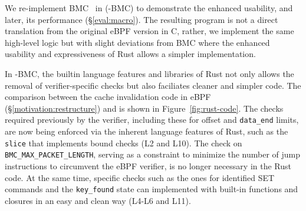 


We re-implement BMC~\cite{BMC} in \projname{} (\projname{}-BMC) to demonstrate
    the enhanced usability, and later, its performance (\S\ref{eval:macro}).
The resulting program is not a direct translation from the original eBPF
    version in C, rather, we implement the same high-level logic but with
    slight deviations from BMC where the enhanced usability and expressiveness
    of Rust allows a simpler implementation.

In \projname{}-BMC, the builtin language features and libraries of Rust not
    only allows the removal of verifier-specific checks but also faciliates
    cleaner and simpler code.
The comparison between the cache invalidation code in eBPF
    (\S\ref{motivation:restructure}) and \projname{} is shown in
    Figure~\ref{fig:rust-code}.
The checks required previously by the verifier, including these for offset and
    \texttt{data\_end} limits, are now being enforced via the inherent language
    features of Rust, such as the \texttt{slice} that implements bound checks
    (L2 and L10).
The check on \texttt{BMC\_MAX\_PACKET\_LENGTH}, serving as a constraint to
    minimize the number of jump instructions to circumvent the eBPF verifier,
    is no longer necessary in the Rust code.
At the same time, specific checks such as the ones for identified SET commands
    and the \texttt{key\_found} state can implemented with built-in
    functions and closures in an easy and clean way (L4-L6 and L11).


